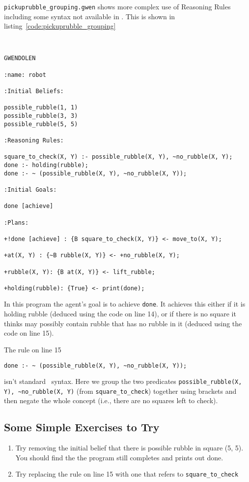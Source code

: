 \texttt{pickuprubble\_grouping.gwen} shows more complex use of Reasoning Rules including some syntax not available in \prolog.  This is shown in listing~\ref{code:pickuprubble_grouping}
\begin{ourexample}
\label{code:pickuprubble_grouping} \quad \\
\begin{lstlisting}[basicstyle=\sffamily,style=easslisting,language=Gwendolen]
GWENDOLEN

:name: robot

:Initial Beliefs:

possible_rubble(1, 1)
possible_rubble(3, 3)
possible_rubble(5, 5)

:Reasoning Rules:

square_to_check(X, Y) :- possible_rubble(X, Y), ~no_rubble(X, Y);
done :- holding(rubble);
done :- ~ (possible_rubble(X, Y), ~no_rubble(X, Y));

:Initial Goals:

done [achieve]

:Plans:

+!done [achieve] : {B square_to_check(X, Y)} <- move_to(X, Y);

+at(X, Y) : {~B rubble(X, Y)} <- +no_rubble(X, Y);

+rubble(X, Y): {B at(X, Y)} <- lift_rubble;

+holding(rubble): {True} <- print(done);
\end{lstlisting}
\end{ourexample}

In this program the agent's goal is to achieve \lstinline{done}.  It achieves this either if it is holding rubble (deduced using the code on line 14), or if there is no square it thinks may possibly contain rubble that has no rubble in it (deduced using the code on line 15).

\begin{sloppypar}
The rule on line 15
\begin{verbatim}
done :- ~ (possible_rubble(X, Y), ~no_rubble(X, Y));
\end{verbatim}
isn't standard \prolog\ syntax.  Here we group the two predicates \lstinline{possible_rubble(X, Y), ~no_rubble(X, Y)} (from \lstinline{square_to_check}) together using brackets and then negate the whole concept (i.e., there are no squares left to check).
\end{sloppypar}

\subsection{Some Simple Exercises to Try}
\begin{enumerate}
\item Try removing the initial belief that there is possible rubble in square (5, 5).  You should find the the program still completes and prints out done.
\item Try replacing the rule on line 15 with one that refers to \lstinline{square_to_check}
\end{enumerate}



